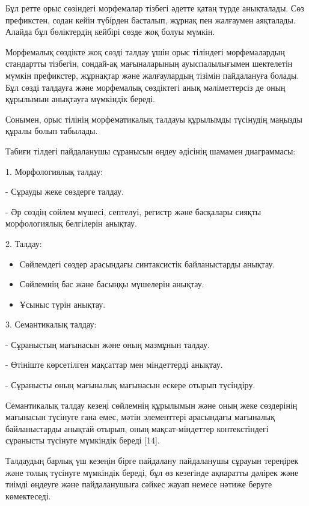 \begin{multicols}{2}
Бұл ретте орыс сөзіндегі морфемалар тізбегі әдетте қатаң түрде
анықталады. Сөз префикстен, содан кейін түбірден басталып, жұрнақ пен
жалғаумен аяқталады. Алайда бұл бөліктердің кейбірі сөзде жоқ болуы
мүмкін.

Морфемалық сөздікте жоқ сөзді талдау үшін орыс тіліндегі морфемалардың
стандартты тізбегін, сондай-ақ мағыналарының ауыспалылығымен шектелетін
мүмкін префикстер, жұрнақтар және жалғаулардың тізімін пайдалануға
болады. Бұл сөзді талдауға және морфемалық сөздіктегі анық мәліметтерсіз
де оның құрылымын анықтауға мүмкіндік береді.

Сонымен, орыс тілінің морфематикалық талдауы құрылымды түсінудің маңызды
құралы болып табылады.

Табиғи тілдегі пайдаланушы сұранысын өңдеу әдісінің шамамен диаграммасы:

1. Морфологиялық талдау:

\hspace{0.5cm}- Сұрауды жеке сөздерге талдау.

\hspace{0.5cm}- Әр сөздің сөйлем мүшесі, септелуі, регистр және басқалары сияқты
морфологиялық белгілерін анықтау.

2. Талдау:

\begin{itemize}
  \setlength{\itemindent}{1cm} 
\item
  Сөйлемдегі сөздер арасындағы синтаксистік байланыстарды анықтау.
\item
  Сөйлемнің бас және басыңқы мүшелерін анықтау.
\item
  Ұсыныс түрін анықтау.
\end{itemize}

3. Семантикалық талдау:

\hspace{0.5cm}- Сұраныстың мағынасын және оның мазмұнын талдау.

\hspace{0.5cm}- Өтініште көрсетілген мақсаттар мен міндеттерді анықтау.

\hspace{0.5cm}- Сұранысты оның мағыналық мағынасын ескере отырып түсіндіру.

Семантикалық талдау кезеңі сөйлемнің құрылымын және оның жеке сөздерінің
мағынасын түсінуге ғана емес, мәтін элементтері арасындағы мағыналық
байланыстарды анықтай отырып, оның мақсат-міндеттер контекстіндегі
сұранысты түсінуге мүмкіндік береді {[}14{]}.

Талдаудың барлық үш кезеңін бірге пайдалану пайдаланушы сұрауын
тереңірек және толық түсінуге мүмкіндік береді, бұл өз кезегінде
ақпаратты дәлірек және тиімді өңдеуге және пайдаланушыға сәйкес жауап
немесе нәтиже беруге көмектеседі.


\end{multicols}
